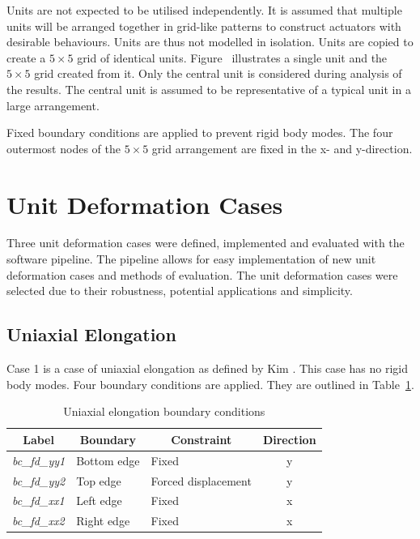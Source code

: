 Units are not expected to be utilised independently. It is assumed that multiple units will be arranged together in grid-like patterns to construct actuators with desirable behaviours. Units are thus not modelled in isolation. Units are copied to create a $5\times 5$ grid of identical units. Figure~ illustrates a single unit and the $5\times 5$ grid created from it. Only the central unit is considered during analysis of the results. The central unit is assumed to be representative of a typical unit in a large arrangement.

Fixed boundary conditions are applied to prevent rigid body modes. The four outermost nodes of the $5\times 5$ grid arrangement are fixed in the x- and y-direction.

\section{Unit Deformation Cases}
\label{sec:UC}

Three unit deformation cases were defined, implemented and evaluated with the software pipeline. The pipeline allows for easy implementation of new unit deformation cases and methods of evaluation. The unit deformation cases were selected due to their robustness, potential applications and simplicity.

\subsection{Uniaxial Elongation}

Case 1 is a case of uniaxial elongation as defined by Kim \citep{Kim2015}. This case has no rigid body modes. Four boundary conditions are applied. They are outlined in Table~\ref{tab:c1}.

\begin{table}[H]
\centering
\begin{tabular}{@{}lllc@{}}
\toprule
\multicolumn{1}{c}{\textbf{Label}} & \multicolumn{1}{c}{\textbf{Boundary}} & \multicolumn{1}{c}{\textbf{Constraint}} & \textbf{Direction} \\ \midrule
\textit{bc\_fd\_yy1} & Bottom edge & Fixed               & y \\
\textit{bc\_fd\_yy2} & Top edge    & Forced displacement & y \\
\textit{bc\_fd\_xx1} & Left edge   & Fixed               & x \\
\textit{bc\_fd\_xx2} & Right edge  & Fixed               & x \\ \bottomrule
\end{tabular}
\caption[Uniaxial elongation boundary conditions]{Uniaxial elongation boundary conditions \citep{Kim2015}}
\label{tab:c1}
\end{table}

